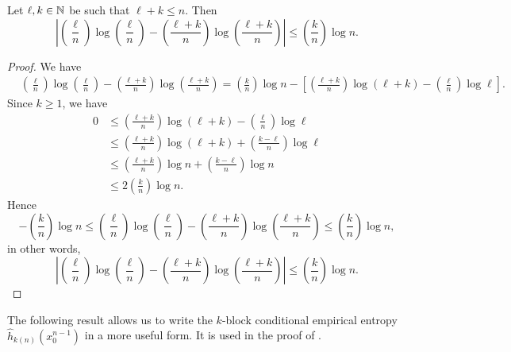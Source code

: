 \begin{proposition}\label{prop:logs-thm-4-1}
	Let $\ell, k \in \mathbb{N}$ be such that $\ell + k \leq n$. Then
	\[
		\left|\left(\frac{\ell}{n}\right)\log\left(\frac{\ell}{n}\right) - \left(\frac{\ell + k}{n}\right)\log\left(\frac{\ell + k}{n}\right)\right| \leq \left(\frac{k}{n}\right)\log{n}.
	\]
	
	\begin{proof}
		We have
		\begin{align*}
			&\left(\frac{\ell}{n}\right)\log\left(\frac{\ell}{n}\right) - \left(\frac{\ell + k}{n}\right)\log\left(\frac{\ell + k}{n}\right) = \left(\frac{k}{n}\right)\log{n} - \left[\left(\frac{\ell + k}{n}\right)\log(\ell + k) - \left(\frac{\ell}{n}\right)\log{\ell}\right].
		\end{align*}
		Since $k \geq 1$, we have
		\begin{align*}
			0 &\leq \left(\frac{\ell + k}{n}\right)\log(\ell + k) - \left(\frac{\ell}{n}\right)\log{\ell} \\
				&\leq \left(\frac{\ell + k}{n}\right)\log(\ell + k) + \left(\frac{k - \ell}{n}\right)\log{\ell} \\
				&\leq \left(\frac{\ell + k}{n}\right)\log{n} + \left(\frac{k - \ell}{n}\right)\log{n} \\
				&\leq 2\left(\frac{k}{n}\right)\log{n}.
		\end{align*}
		Hence
		\[
			-\left(\frac{k}{n}\right)\log{n} \leq \left(\frac{\ell}{n}\right)\log\left(\frac{\ell}{n}\right) - \left(\frac{\ell + k}{n}\right)\log\left(\frac{\ell + k}{n}\right) \leq \left(\frac{k}{n}\right)\log{n},
		\]
		in other words,
		\[
			\left|\left(\frac{\ell}{n}\right)\log\left(\frac{\ell}{n}\right) - \left(\frac{\ell + k}{n}\right)\log\left(\frac{\ell + k}{n}\right)\right| \leq \left(\frac{k}{n}\right)\log{n}.
		\]
	\end{proof}
\end{proposition}

The following result allows us to write the $k$-block conditional empirical entropy $\hat{h}_{k(n)}(x_0^{n - 1})$ in a more useful form. It is used in the proof of .

